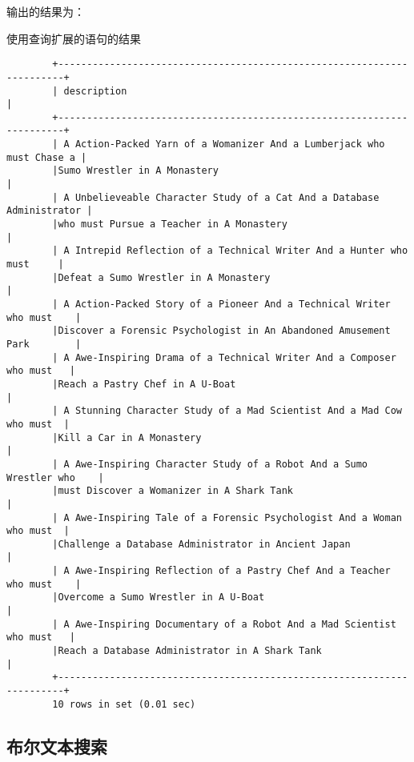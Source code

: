 \documentclass[UTF8]{article}
\begin{document}
输出的结果为：

\begin{listing}[H]
	\caption{使用查询扩展的语句的结果}
	\label{code:usesearchexpansionclauseresult}
\begin{verbatim}
        +-----------------------------------------------------------------------+
        | description                                                           |
        +-----------------------------------------------------------------------+
        | A Action-Packed Yarn of a Womanizer And a Lumberjack who must Chase a |
        |Sumo Wrestler in A Monastery                                           |
        | A Unbelieveable Character Study of a Cat And a Database Administrator |
        |who must Pursue a Teacher in A Monastery                               |
        | A Intrepid Reflection of a Technical Writer And a Hunter who must     |
        |Defeat a Sumo Wrestler in A Monastery                                  |
        | A Action-Packed Story of a Pioneer And a Technical Writer who must    |
        |Discover a Forensic Psychologist in An Abandoned Amusement Park        |
        | A Awe-Inspiring Drama of a Technical Writer And a Composer who must   |
        |Reach a Pastry Chef in A U-Boat                                        |
        | A Stunning Character Study of a Mad Scientist And a Mad Cow who must  | 
        |Kill a Car in A Monastery                                              |
        | A Awe-Inspiring Character Study of a Robot And a Sumo Wrestler who    |
        |must Discover a Womanizer in A Shark Tank                              |
        | A Awe-Inspiring Tale of a Forensic Psychologist And a Woman who must  |
        |Challenge a Database Administrator in Ancient Japan                    |
        | A Awe-Inspiring Reflection of a Pastry Chef And a Teacher who must    |
        |Overcome a Sumo Wrestler in A U-Boat                                   |
        | A Awe-Inspiring Documentary of a Robot And a Mad Scientist who must   |
        |Reach a Database Administrator in A Shark Tank                         |
        +-----------------------------------------------------------------------+
        10 rows in set (0.01 sec)
\end{verbatim}
\end{listing}

\subsection{布尔文本搜索}
\end{document}

